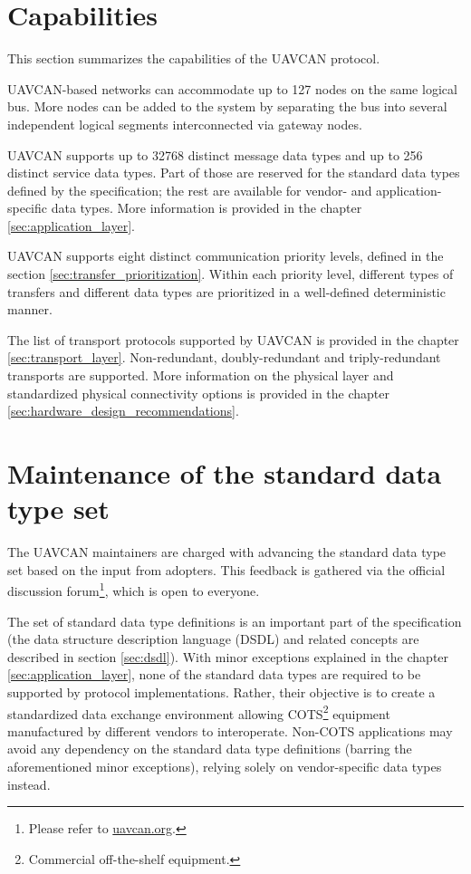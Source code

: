 \section{Capabilities}

This section summarizes the capabilities of the UAVCAN protocol.

UAVCAN-based networks can accommodate up to 127 nodes on the same logical bus.
More nodes can be added to the system by separating the bus into several independent logical segments
interconnected via gateway nodes.

UAVCAN supports up to 32768 distinct message data types and up to 256 distinct service data types.
Part of those are reserved for the standard data types defined by the specification;
the rest are available for vendor- and application-specific data types.
More information is provided in the chapter \ref{sec:application_layer}.

UAVCAN supports eight distinct communication priority levels,
defined in the section \ref{sec:transfer_prioritization}.
Within each priority level, different types of transfers and different data types are
prioritized in a well-defined deterministic manner.

The list of transport protocols supported by UAVCAN is provided in the chapter \ref{sec:transport_layer}.
Non-redundant, doubly-redundant and triply-redundant transports are supported.
More information on the physical layer and standardized physical connectivity options
is provided in the chapter \ref{sec:hardware_design_recommendations}.

\section{Maintenance of the standard data type set}

The UAVCAN maintainers are charged with advancing the standard data type set based on the input from adopters.
This feedback is gathered via the official discussion
forum\footnote{Please refer to \href{http://uavcan.org}{uavcan.org}.},
which is open to everyone.

The set of standard data type definitions is an important part of the specification
(the data structure description language (DSDL) and related concepts are described in section \ref{sec:dsdl}).
With minor exceptions explained in the chapter \ref{sec:application_layer},
none of the standard data types are required to be supported by protocol implementations.
Rather, their objective is to create a standardized data exchange environment
allowing COTS\footnote{Commercial off-the-shelf equipment.} equipment manufactured by different vendors to
interoperate.
Non-COTS applications may avoid any dependency on the standard data type definitions (barring the aforementioned
minor exceptions), relying solely on vendor-specific data types instead.

